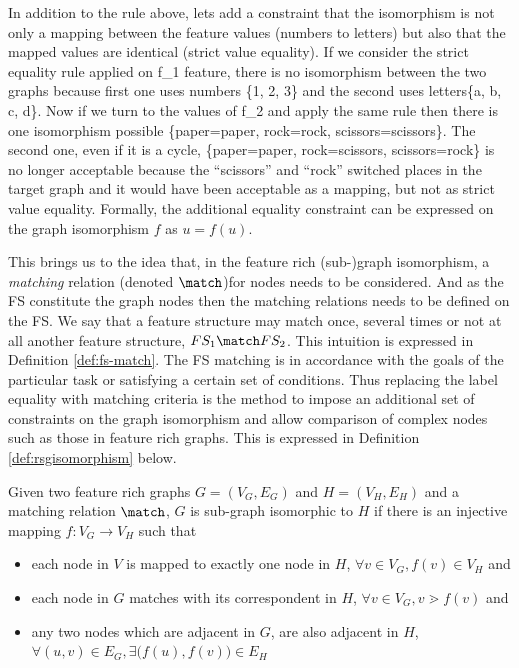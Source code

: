 In addition to the rule above, lets add a constraint that the isomorphism is not only a mapping between the feature values (numbers to letters) but also that the mapped values are identical (strict value equality). 
If we consider the strict equality rule applied on f_1 feature, there is no isomorphism between the two graphs because first one uses numbers  \{1, 2, 3\} and the second uses letters\{a, b, c, d\}. Now if we turn to the values of f_2 and apply the same rule then there is one isomorphism possible \{paper=paper, rock=rock, scissors=scissors\}. The second one, even if it is a cycle, \{paper=paper, rock=scissors, scissors=rock\} is no longer acceptable because the ``scissors'' and ``rock'' switched places in the target graph and it would have been acceptable as a mapping, but not as strict value equality. Formally, the additional equality constraint can be expressed on the graph isomorphism $f$ as $u=f(u)$.

This brings us to the idea that, in the feature rich (sub-)graph isomorphism, a \textit{matching} relation (denoted $\match$)for nodes needs to be considered. And as the FS constitute the graph nodes then the matching relations needs to be defined on the FS. We say that a feature structure may match once, several times or not at all another feature structure, $FS_1 \match FS_2$. This intuition is expressed in Definition \ref{def:fs-match}.
The FS matching is in accordance with the goals of the particular task or satisfying a certain set of conditions. Thus replacing the label equality with matching criteria is the method to impose an additional set of constraints on the graph isomorphism and allow comparison of complex nodes such as those in feature rich graphs. This is expressed in Definition \ref{def:rsgisomorphism} below. 

\begin{definition}\label{def:rsgisomorphism}
    Given two feature rich graphs $G=(V_G,E_G)$ and $H=(V_H,E_H)$ and a matching relation $\match$, $G$ is sub-graph isomorphic to $H$ if there is an injective mapping $f:V_G \rightarrow V_H$ such that
    \begin{itemize}
        \item each node in $V$ is mapped to exactly one node in $H$, $\forall v \in V_G, f(v) \in V_H$ and
        \item each node in $G$ matches with its correspondent in $H$, $\forall v \in V_G, v \gtrdot f(v)$ and
        \item any two nodes which are adjacent in $G$, are also adjacent in $H$, $\forall (u,v) \in E_G, \exists \big(f(u), f(v)\big) \in E_H $
    \end{itemize}
\end{definition}

